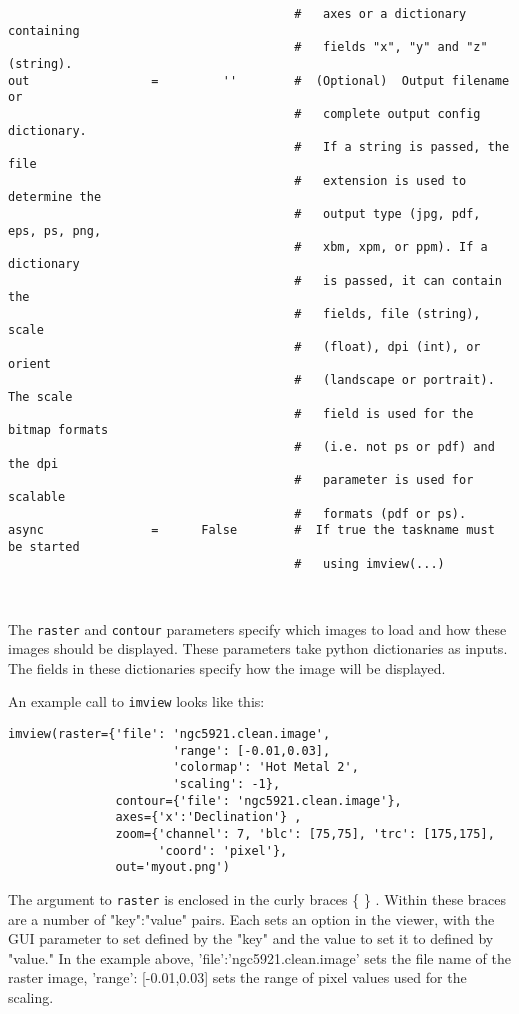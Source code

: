 \begin{verbatim}
                                        #   axes or a dictionary containing
                                        #   fields "x", "y" and "z" (string).
out                 =         ''        #  (Optional)  Output filename or
                                        #   complete output config dictionary.
                                        #   If a string is passed, the file
                                        #   extension is used to determine the
                                        #   output type (jpg, pdf, eps, ps, png,
                                        #   xbm, xpm, or ppm). If a dictionary
                                        #   is passed, it can contain the
                                        #   fields, file (string), scale
                                        #   (float), dpi (int), or orient
                                        #   (landscape or portrait). The scale
                                        #   field is used for the bitmap formats
                                        #   (i.e. not ps or pdf) and the dpi
                                        #   parameter is used for scalable
                                        #   formats (pdf or ps).
async               =      False        #  If true the taskname must be started
                                        #   using imview(...)



\end{verbatim}
\normalsize

The {\tt raster} and {\tt contour} parameters specify which images to load
and how these images should be displayed. These parameters take 
python dictionaries as inputs. The fields in these dictionaries specify how
the image will be displayed.

An example call to {\tt imview} looks like this:

\small
\begin{verbatim}
imview(raster={'file': 'ngc5921.clean.image',
                       'range': [-0.01,0.03],
                       'colormap': 'Hot Metal 2',
                       'scaling': -1},
               contour={'file': 'ngc5921.clean.image'},
               axes={'x':'Declination'} ,
               zoom={'channel': 7, 'blc': [75,75], 'trc': [175,175],
                     'coord': 'pixel'},
               out='myout.png')
\end{verbatim}
\normalsize

The argument to {\tt raster} is enclosed in the curly braces \{ \} . Within these
braces are a number of "key":"value" pairs. Each sets an option in the viewer,
with the GUI parameter to set defined by the "key" and the value to set it to
defined by "value." In the example above, 'file':'ngc5921.clean.image' 
sets the file name of the raster image, 'range': [-0.01,0.03] sets the range of
pixel values used for the scaling.

